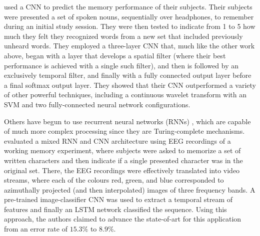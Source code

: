 \documentclass[utf8]{frontiersSCNS} %
\begin{document}
\cite{Sun} used a CNN to predict the memory performance of their subjects. Their subjects were presented a set of spoken nouns, sequentially over headphones, to remember during an initial study session. They were then tested to indicate from 1 to 5 how much they felt they recognized words from a new set that included previously unheard words. They employed a three-layer CNN that, much like the other work above, began with a layer that develops a spatial filter (where their best performance is achieved with a single such filter), and then is followed by an exclusively temporal filter, and finally with a fully connected output layer before a final softmax output layer. They showed that their CNN outperformed a variety of other powerful techniques, including a continuous wavelet transform with an SVM and two fully-connected neural network configurations. 

Others have begun to use recurrent neural networks (RNNs) \cite{Bashivan2016}, which are capable of much more complex processing since they are Turing-complete mechanisms. \cite{Bashivan2016} evaluated a mixed RNN and CNN architecture using EEG recordings of a working memory experiment, where subjects were asked to memorize a set of written characters and then indicate if a single presented character was in the original set. There, the EEG recordings were effectively translated into video streams, where each of the colours red, green, and blue corresponded to azimuthally projected (and then interpolated) images of three frequency bands. A pre-trained image-classifier CNN was used to extract a temporal stream of features and finally an LSTM network classified the sequence. Using this approach, the authors claimed to advance the state-of-art for this application from an error rate of $15.3\%$ to $8.9\%$.
\end{document}
